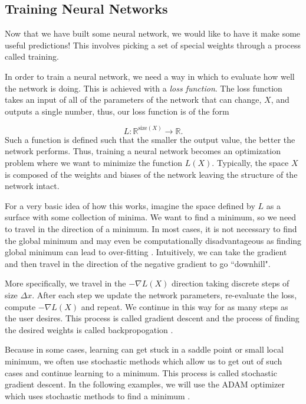 \documentclass{CUP-JNL-DTM}%
\theoremstyle{definition}
\numberwithin{equation}{section}
\begin{document}

\subsection{Training Neural Networks}

Now that we have built some neural network, we would like to have it make some useful predictions! This involves picking a set of special weights through a process called training. 

In order to train a neural network, we need a way in which to evaluate how well the network is doing. This is achieved with a \emph{loss function}. The loss function takes an input of all of the parameters of the network that can change, $X$, and outputs a single number, thus, our loss function is of the form

\begin{equation}
    L : \mathbb{R}^{\textrm{size}(X)} \rightarrow \mathbb{R}. 
\end{equation}
Such a function is defined such that the smaller the output value, the better the network performs. Thus, training a neural network becomes an optimization problem where we want to minimize the function $L(X)$. Typically, the space $X$ is composed of the weights and biases of the network leaving the structure of the network intact. 

For a very basic idea of how this works, imagine the space defined by $L$ as a surface with some collection of minima. We want to find a minimum, so we need to travel in the direction of a minimum. In most cases, it is not necessary to find the global minimum and may even be computationally disadvantageous as finding global minimum can lead to over-fitting \cite{choromanskaLossSurfacesMultilayer2015}. Intuitively, we can take the gradient and then travel in the direction of the negative gradient to go ``downhill". 

More specifically, we travel in the $-\nabla L(X)$ direction taking discrete steps of size $\Delta x$. After each step we update the network parameters, re-evaluate the loss, compute $-\nabla L(X)$ and repeat. We continue in this way for as many steps as the user desires. This process is called gradient descent and the process of finding the desired weights is called backpropogation \cite{chauvinBackpropagationTheoryArchitectures1995}. 

Because in some cases, learning can get stuck in a saddle point or small local minimum, we often use stochastic methods which allow us to get out of such cases and continue learning to a minimum. This process is called stochastic gradient descent. In the following examples, we will use the ADAM optimizer which uses stochastic methods to find a minimum \cite{kingmaAdamMethodStochastic2017}. 
\end{document}
